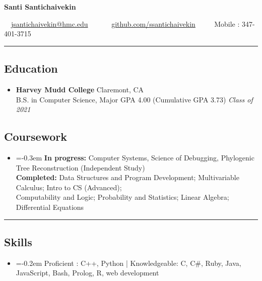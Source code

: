 \documentclass[10.5pt,letterpaper]{article}
\begin{document}
\begin{center}
{\Large \textbf{Santi Santichaivekin}}

\ \ \href{mailto:jsantichaivekin@hmc.edu}{jsantichaivekin@hmc.edu}\ \ 
\ \ \textbullet
\ \ \href{https://github.com/ssantichaivekin}{github.com/ssantichaivekin}
\ \ \textbullet
\ \ Mobile : 347-401-3715

\end{center}


\hrule
\vspace{-0.95em}
\subsection*{Education}
  \begin{itemize}
    \parskip=-0.5em

    \item[]
    \textbf{Harvey Mudd College} \hfill
      Claremont, CA\\
    {B.S. in Computer Science, Major GPA 4.00 (Cumulative GPA 3.73) \hfill \emph{Class of 2021}}
  \end{itemize}
  \vspace{-2.07em}
\subsection*{Coursework}
\begin{itemize}
\item[]
    \parskip=-0.3em
  \textbf{In progress:}  Computer Systems, Science of Debugging, Phylogenic Tree Reconstruction (Independent Study)\\
  \textbf{Completed:} Data Structures and Program Development; 
  Multivariable Calculus;
  Intro to CS (Advanced); \\
  Computability and Logic; 
  Probability and Statistics;
  Linear Algebra;
  Differential Equations

\end{itemize}

\hrule
\vspace{-0.95em}
\subsection*{Skills}
\begin{itemize}
\item[]
    \parskip=-0.2em
  Proficient : C++, Python | Knowledgeable: C, C\#, Ruby, Java, JavaScript, Bash, Prolog, R, web development
    
\end{itemize}
\end{document}
